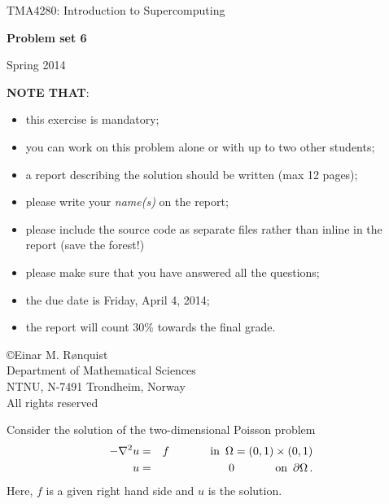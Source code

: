 \documentclass[11pt]{article}
\begin{document}
 
\LARGE
\begin{center}
TMA4280: Introduction to Supercomputing
\end{center}
\vspace{0.5in}

\begin{center}
{\bf Problem set 6}
\end{center}

\Large
\vspace{0.5in}
\begin{center}
Spring 2014
\end{center}

\vspace{0.5in}

{\bf NOTE THAT}:
\begin{itemize}
\item this exercise is mandatory;
\item you can work on this problem alone or with up to two other students;
\item a report describing the solution should be written (max 12 pages);
\item please write your \emph{name(s)} on the report; 
\item please include the source code as separate files rather than inline in the report (save the forest!)
\item please make sure that you have answered all the questions; 
\item the due date is Friday, April 4, 2014;
\item the report will count 30\% towards the final grade.
\end{itemize}

\vspace{0.5in}

\begin{center}
\copyright Einar M. R{\o}nquist \\
Department of Mathematical Sciences\\
NTNU, N-7491 Trondheim, Norway\\
All rights reserved
\end{center}

\large

\newpage


Consider the solution of the two-dimensional Poisson problem
\begin{eqnarray}
-\nabla^2 u & = & f \hspace{.5in} \textrm{in} \,\,\, \Omega = (0,1)\times (0,1) \\
u & = & 0 \hspace{.5in} \textrm{on} \,\,\, \partial\Omega\, .
\end{eqnarray}
Here, $f$ is a given right hand side and $u$ is the solution.
\end{document}
